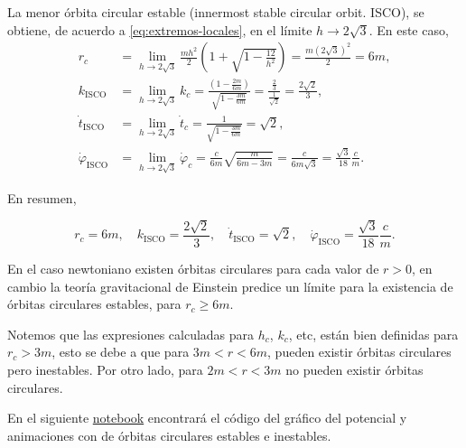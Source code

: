 \documentclass[letterpaper,11pt]{article}
\begin{document}
La menor órbita circular estable (innermost stable circular orbit. ISCO), se obtiene, de acuerdo a \eqref{eq:extremos-locales}, en el límite $h\to 2\sqrt{3}$. En este caso, 
\begin{align}
r_c &= \lim_{h\to 2\sqrt{3}} \frac{mh^2}{2} \left(1 + \sqrt{1 - \frac{12}{h^2}} \right) = \frac{m (2\sqrt{3})^2}{2} = 6m, \\
k_{\text{ISCO}} &= \lim_{h\to 2\sqrt{3}} k_c = \frac{\left(1 - \frac{2m}{6m} \right)}{\sqrt{1 - \frac{3m}{6m}}} = \frac{\frac{2}{3}}{\frac{1}{\sqrt{2}}} = \frac{2\sqrt{2}}{3}, \\
\dot{t}_{\text{ISCO}} &= \lim_{h\to 2\sqrt{3}} \dot{t}_c = \frac{1}{\sqrt{1 - \frac{3m}{6m}}} = \sqrt{2}, \\
\dot{\varphi}_{\text{ISCO}} &=  \lim_{h\to 2\sqrt{3}} \dot{\varphi}_c = \frac{c}{6m} \sqrt{\frac{m}{6m-3m}} = \frac{c}{6m \sqrt{3}} = \frac{\sqrt{3}}{18} \frac{c}{m}.
\end{align}

En resumen,
\begin{shaded}
\begin{equation} \label{eq:ISCO}
r_c = 6m, \quad k_{\text{ISCO}} = \frac{2\sqrt{2}}{3}, \quad \dot{t}_{\text{ISCO}} = \sqrt{2}, \quad \dot{\varphi}_{\text{ISCO}} = \frac{\sqrt{3}}{18} \frac{c}{m}.
\end{equation}
\end{shaded}

En el caso newtoniano existen órbitas circulares para cada valor de $r > 0$, en cambio la teoría gravitacional de Einstein predice un límite para la existencia de órbitas circulares estables, para $r_c \geq 6m$.

Notemos que las expresiones calculadas para $h_c$, $k_c$, etc, están bien definidas para $r_c > 3m$, esto se debe a que para $3m < r < 6m$, pueden existir órbitas circulares pero inestables. Por otro lado, para $2m < r < 3m$ no pueden existir órbitas circulares.

En el siguiente \href{https://github.com/AleSaa66/Topicos-RG/blob/main/Semana%203/Semana-3.ipynb}{notebook} encontrará el código del gráfico del potencial y animaciones con de órbitas circulares estables e inestables.
\end{document}
